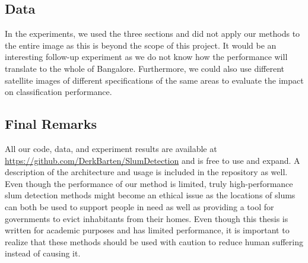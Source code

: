 \subsection{Data}
In the experiments, we used the three sections and did not apply our methods to the entire image as this is beyond the scope of this project. It would be an interesting follow-up experiment as we do not know how the performance will translate to the whole of Bangalore. Furthermore, we could also use different satellite images of different specifications of the same areas to evaluate the impact on classification performance.

\subsection{Final Remarks}
All our code, data, and experiment results are available at \url{https://github.com/DerkBarten/SlumDetection} and is free to use and expand. A description of the architecture and usage is included in the repository as well.
Even though the performance of our method is limited, truly high-performance slum detection methods might become an ethical issue as the locations of slums can both be used to support people in need as well as providing a tool for governments to evict inhabitants from their homes. Even though this thesis is written for academic purposes and has limited performance, it is important to realize that these methods should be used with caution to reduce human suffering instead of causing it.





